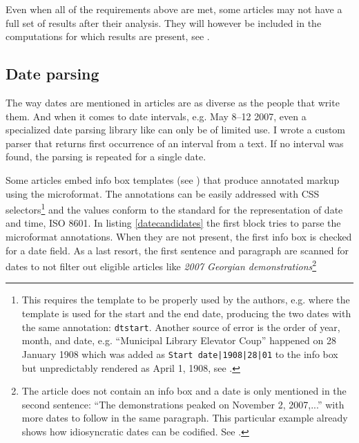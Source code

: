 Even when all of the requirements above are met, some articles may not have a full set of results after their analysis.
They will however be included in the computations for which results are present, see .

\subsection{Date parsing}

The way dates are mentioned in articles are as diverse as the people that write them.
And when it comes to date intervals, e.g. May 8--12 2007, even a specialized date parsing library like  can only be of limited use.
I wrote a custom parser that returns first occurrence of an interval from a text.
If no interval was found, the parsing is repeated for a single date.

Some articles embed info box templates (see ) that produce annotated markup using the  microformat.
The annotations can be easily addressed with \ac{CSS} selectors\footnote{This requires the template to be properly used by the authors, e.g.  where  the template  is used for the start and the end date, producing the two dates with the same annotation: \verb"dtstart". Another source of error is the order of year, month, and date, e.g. ``Municipal Library Elevator Coup'' happened on 28 January 1908 which was added as  \verb"Start date|1908|28|01" to the info box but unpredictably rendered as April 1, 1908, see .} and the values conform to the standard for the representation of date and time, \ac{ISO} 8601.
In listing \ref{datecandidates} the first block tries to parse the microformat annotations.
When they are not present, the first info box is checked for a date field.
As a last resort, the first sentence and paragraph are scanned for dates to not filter out eligible articles like \emph{2007 Georgian demonstrations}\footnote{The article does not contain an info box and a date is only mentioned in the second sentence: ``The demonstrations peaked on November 2, 2007,...'' with more dates to follow in the same paragraph. This particular example already shows how idiosyncratic dates can be codified. See .}

